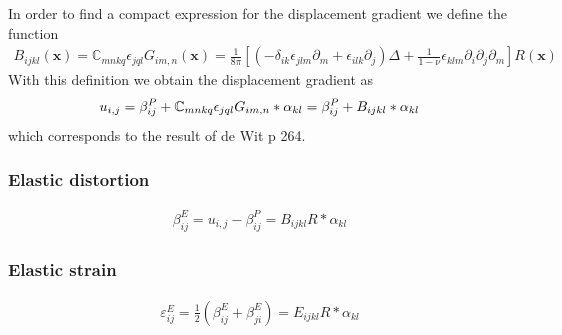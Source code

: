 In order to find a compact expression for the displacement gradient we define the function
\begin{align}
B_{ijkl}(\bm x)=\mathbb{C}_{mnkq}\epsilon_{jql}G_{im,n}(\bm x)
=\frac{1}{8\pi}\left[\left(-\delta_{ik}\epsilon_{jlm}\partial_m+\epsilon_{ilk}\partial_j\right)\Delta+\frac{1}{1-\nu}\epsilon_{klm}\partial_i\partial_j\partial_m\right] R(\bm x)
\end{align}
With this definition we obtain the displacement gradient as
\begin{align}
u_{i,j}=\beta^P_{ij}+\mathbb{C}_{mnkq}\epsilon_{jql}G_{im,n}*\alpha_{kl}=\beta^P_{ij}+B_{ijkl}*\alpha_{kl}
\end{align}
which corresponds to the result of  de Wit p 264.

\subsubsection{Elastic distortion}
\begin{align}
\beta^E_{ij}=u_{i,j}-\beta^P_{ij}=B_{ijkl}R*\alpha_{kl}
\end{align}

\subsubsection{Elastic strain}
\begin{align}
\varepsilon^E_{ij}=\frac{1}{2}\left(\beta^E_{ij}+\beta^E_{ji}\right)=E_{ijkl}R*\alpha_{kl}
\end{align}

